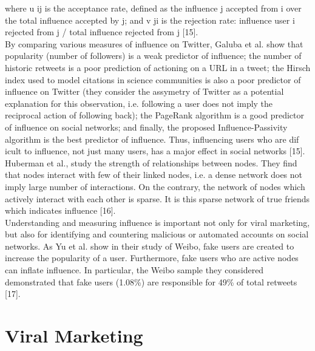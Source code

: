 \documentclass[conference,letterpaper]{IEEEtran}
\begin{document}
where u ij is the acceptance rate, defined as the influence j accepted from i over the total influence accepted
by j; and v ji is the rejection rate: influence user i rejected from j / total influence rejected from j [15].\\
By comparing various measures of influence on Twitter, Galuba et al. show that popularity (number of followers)
is a weak predictor of influence; the number of historic retweets is a poor prediction of actioning on a URL in a tweet;
the Hirsch index used to model citations in science communities is also a poor predictor of influence on Twitter
(they consider the assymetry of Twitter as a potential explanation for this observation, i.e. following a user
does not imply the reciprocal action of following back); the PageRank algorithm is a good predictor of influence
on social networks; and finally, the proposed Influence-Passivity algorithm is the best predictor of influence.
Thus, influencing users who are dif icult to influence, not just many users, has a major effect in social networks [15].\\
\indent
Huberman et al., study the strength of relationships between nodes. They find that nodes interact with few of
their linked nodes, i.e. a dense network does not imply large number of interactions. On the contrary, the network
of nodes which actively interact with each other is sparse. It is this sparse network of true friends which
indicates influence [16].\\
Understanding and measuring influence is important not only for viral marketing, but also for identifying
and countering malicious or automated accounts on social networks. As Yu et al. show in their study of Weibo,
fake users are created to increase the popularity of a user. Furthermore, fake users who are active nodes can
inflate influence. In particular, the Weibo sample they considered demonstrated that fake users (1.08\%)
are responsible for 49\% of total retweets [17]. \\

\section{Viral Marketing}
\end{document}
